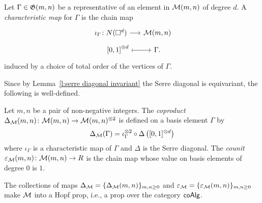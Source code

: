 \begin{definition}
	Let $\Gamma \in \mathfrak{G}(m,n)$ be a representative of an element in $\mathcal{M}(m,n)$ of degree $d$. A \textit{characteristic map} for $\Gamma$ is the chain map \vspace*{-5pt}
	\begin{equation} \label{e:order chain map}
	\begin{tikzcd}[row sep=tiny, column sep=small]
	\iota_\Gamma \colon \cchains(\square^d) \arrow[r] & \M(m,n) \\
	\qquad {[0,1]}^{\otimes d} \arrow[r, |->] & \Gamma.
	\end{tikzcd}
	\end{equation}
	induced by a choice of total order of the vertices of $\Gamma$.
\end{definition}

Since by Lemma~\ref{l:serre diagonal invariant} the Serre diagonal is equivariant, the following is well-defined.
\begin{definition}
	Let $m,n$ be a pair of non-negative integers.
	The \textit{coproduct} $\Delta_{\mathcal{M}}(m,n) \colon \mathcal{M}(m,n) \to \mathcal{M}(m,n)^{\otimes 2}$ is defined on a basis element $\Gamma$ by
	\begin{equation} \label{e:diagonal of M}
	\Delta_{\mathcal{M}}(\Gamma) = \iota_\Gamma^{\otimes 2} \circ \Delta \left([0,1]^{\otimes d}\right)
	\end{equation}
	where $\iota_\Gamma$ is a characteristic map of $\Gamma$ and $\Delta$ is the Serre diagonal.
	The \textit{counit} $\varepsilon_{\mathcal{M}}(m,n) \colon \mathcal{M}(m,n) \to R$ is the chain map whose value on basis elements of degree $0$ is $1$. 
\end{definition}

\begin{theorem}
	The collections of maps $\Delta_{\mathcal{M}} = \{\Delta_{\mathcal{M}}(m,n)\}_{m,n \geq 0}$ and $\varepsilon_{\mathcal{M}} = \{\varepsilon_{\mathcal{M}}(m,n)\}_{m,n\geq0}$ make $\mathcal{M}$ into a Hopf prop, i.e., a prop over the category $\mathsf{coAlg}$.
\end{theorem}

